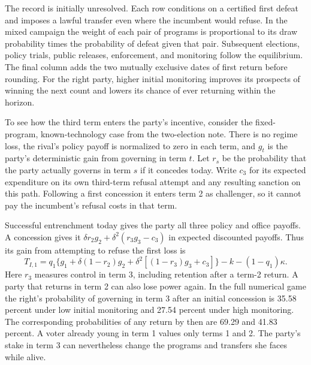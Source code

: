 \documentclass[11pt,letterpaper]{article}
\begin{document}
The record is initially unresolved. Each row conditions on a certified first defeat and imposes a lawful transfer even where the incumbent would refuse. In the mixed campaign the weight of each pair of programs is proportional to its draw probability times the probability of defeat given that pair. Subsequent elections, policy trials, public releases, enforcement, and monitoring follow the equilibrium. The final column adds the two mutually exclusive dates of first return before rounding. For the right party, higher initial monitoring improves its prospects of winning the next count and lowers its chance of ever returning within the horizon.

To see how the third term enters the party's incentive, consider the fixed-program, known-technology case from the two-election note. There is no regime loss, the rival's policy payoff is normalized to zero in each term, and \(g_t\) is the party's deterministic gain from governing in term \(t\). Let \(r_s\) be the probability that the party actually governs in term \(s\) if it concedes today. Write \(c_3\) for its expected expenditure on its own third-term refusal attempt and any resulting sanction on this path. Following a first concession it enters term 2 as challenger, so it cannot pay the incumbent's refusal costs in that term.

Successful entrenchment today gives the party all three policy and office payoffs. A concession gives it \(\delta r_2g_2+\delta^2(r_3g_3-c_3)\) in expected discounted payoffs. Thus its gain from attempting to refuse the first loss is
\[
 T_{I,1}=q_1\big\{g_1+\delta(1-r_2)g_2+
           \delta^2[(1-r_3)g_3+c_3]\big\}-k-(1-q_1)\kappa .
\]
Here \(r_3\) measures control in term 3, including retention after a term-2 return. A party that returns in term 2 can also lose power again. In the full numerical game the right's probability of governing in term 3 after an initial concession is 35.58 percent under low initial monitoring and 27.54 percent under high monitoring. The corresponding probabilities of any return by then are 69.29 and 41.83 percent. A voter already young in term 1 values only terms 1 and 2. The party's stake in term 3 can nevertheless change the programs and transfers she faces while alive.
\end{document}
